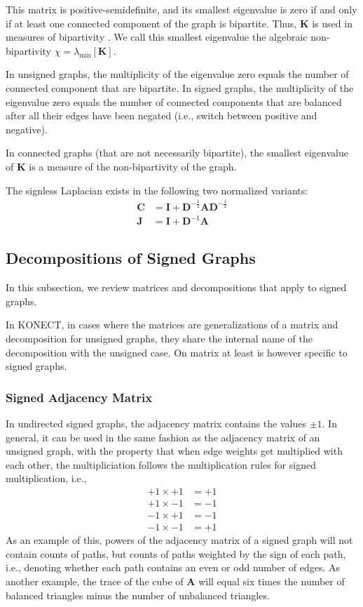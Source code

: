 \documentclass{article}
\begin{document}
This matrix is positive-semidefinite, and its smallest eigenvalue is
zero if and only if at least one connected component of the graph is bipartite.  Thus, $\mathbf K$ is used
in measures of bipartivity \citep[see e.g.][]{kunegis:bipartivity}.   We
call this smallest eigenvalue the algebraic non-bipartivity $\chi =
\lambda_{\min}[\mathbf K]$. 

In unsigned graphs, the multiplicity of the eigenvalue zero equals the
number of connected component that are bipartite.  
In signed graphs, the multiplicity of the eigenvalue zero equals the
number of connected components that are balanced after all their edges
have been negated (i.e., switch between positive and negative). 

In connected graphs (that are not necessarily bipartite), the smallest
eigenvalue of $\mathbf K$ is a measure of the non-bipartivity of the
graph. 

The signless Laplacian exists in the following two normalized variants:
\begin{align}
  \mathbf C &= \mathbf I + \mathbf D^{-\frac 12}\mathbf A\mathbf D^{-\frac 12} \\
  \mathbf J &= \mathbf I + \mathbf D^{-1} \mathbf A
\end{align}

\subsection{Decompositions of Signed Graphs}
In this subsection, we review matrices and decompositions that apply to
signed graphs.  

In KONECT, in cases where the matrices are generalizations of a matrix and
decomposition for unsigned graphs, they share the internal name of the
decomposition with the unsigned case.  On matrix at least is however
specific to signed graphs. 

\subsubsection{Signed Adjacency Matrix}
In undirected signed graphs, the adjacency matrix contains the values
$\pm 1$.  In general, it can be used in the same fashion as the
adjacency matrix of an unsigned graph, with the property that when edge
weights get multiplied with each other, the multipliciation follows the
multiplication rules for signed multiplication, i.e., 
\begin{align*}
  +1 \times +1 &= +1 \\
  +1 \times -1 &= -1 \\
  -1 \times +1 &= -1 \\
  -1 \times -1 &= +1 
\end{align*}
As an example of this, powers of the adjacency matrix of a signed graph
will not contain counts of paths, but counts of paths weighted by the
sign of each path, i.e., denoting whether each path contains an even or
odd number of edges.  As another example, the trace of the cube of
$\mathbf A$ will equal six times the number of balanced triangles minus
the number of unbalanced triangles. 
\end{document}
